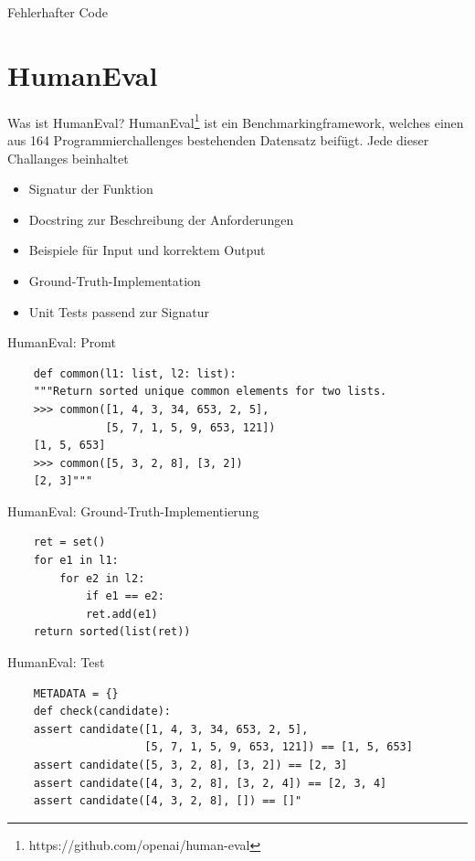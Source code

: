 \documentclass{beamer}              %
\begin{document}
\begin{frame}{Fehlerhafter Code}
\section{HumanEval}
\begin{frame}{Was ist HumanEval?}
HumanEval\footnote{https://github.com/openai/human-eval} ist ein Benchmarkingframework, welches einen aus 164 Programmierchallenges bestehenden Datensatz beifügt\cite{chen2021evaluating}. Jede dieser Challanges beinhaltet
\begin{itemize}
    \item Signatur der Funktion
    \item Docstring zur Beschreibung der Anforderungen
    \item Beispiele für Input und korrektem Output
    \item Ground-Truth-Implementation
    \item Unit Tests passend zur Signatur
\end{itemize}
\end{frame}

\begin{frame}[fragile]{HumanEval: Promt}
    \begin{lstlisting}
    def common(l1: list, l2: list):
    """Return sorted unique common elements for two lists.
    >>> common([1, 4, 3, 34, 653, 2, 5],
               [5, 7, 1, 5, 9, 653, 121])
    [1, 5, 653]
    >>> common([5, 3, 2, 8], [3, 2])
    [2, 3]"""
    \end{lstlisting}
\end{frame}
\begin{frame}[fragile]{HumanEval: Ground-Truth-Implementierung}
  \begin{lstlisting}
    ret = set()
    for e1 in l1:
        for e2 in l2:
            if e1 == e2:
            ret.add(e1)
    return sorted(list(ret))
   \end{lstlisting}
\end{frame}
\begin{frame}[fragile]{HumanEval: Test}
    \begin{lstlisting}
    METADATA = {}
    def check(candidate):
    assert candidate([1, 4, 3, 34, 653, 2, 5],
                     [5, 7, 1, 5, 9, 653, 121]) == [1, 5, 653]
    assert candidate([5, 3, 2, 8], [3, 2]) == [2, 3]
    assert candidate([4, 3, 2, 8], [3, 2, 4]) == [2, 3, 4]
    assert candidate([4, 3, 2, 8], []) == []"
    \end{lstlisting}
\end{frame}


\end{frame}
\end{document}

